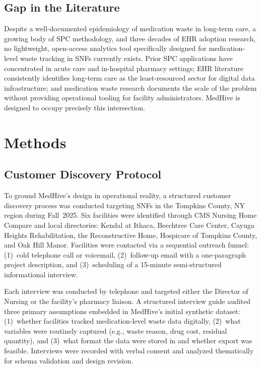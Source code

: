 \documentclass[letterpaper, 10pt, conference]{IEEEconf}
\begin{document}
\subsection{Gap in the Literature}

Despite a well-documented epidemiology of medication waste in long-term care, a
growing body of SPC methodology, and three decades of EHR adoption research,
no lightweight, open-access analytics tool specifically designed for
medication-level waste tracking in SNFs currently exists.
Prior SPC applications have concentrated in acute care and in-hospital pharmacy
settings; EHR literature consistently identifies long-term care as the
least-resourced sector for digital data infrastructure; and medication waste
research documents the scale of the problem without providing operational
tooling for facility administrators.
MedHive is designed to occupy precisely this intersection.

\section{Methods}

\subsection{Customer Discovery Protocol}

To ground MedHive's design in operational reality, a structured customer
discovery process was conducted targeting SNFs in the Tompkins County, NY
region during Fall~2025.
Six facilities were identified through CMS Nursing Home Compare and local
directories: Kendal at Ithaca, Beechtree Care Center, Cayuga Heights
Rehabilitation, the Reconstructive Home, Hospicare of Tompkins County, and Oak
Hill Manor.
Facilities were contacted via a sequential outreach funnel: (1)~cold telephone
call or voicemail, (2)~follow-up email with a one-paragraph project description,
and (3)~scheduling of a 15-minute semi-structured informational interview.

Each interview was conducted by telephone and targeted either the Director of
Nursing or the facility's pharmacy liaison.
A structured interview guide audited three primary assumptions embedded in
MedHive's initial synthetic dataset: (1)~whether facilities tracked
medication-level waste data digitally, (2)~what variables were routinely
captured (e.g., waste reason, drug cost, residual quantity), and
(3)~what format the data were stored in and whether export was feasible.
Interviews were recorded with verbal consent and analyzed thematically for
schema validation and design revision.
\end{document}
